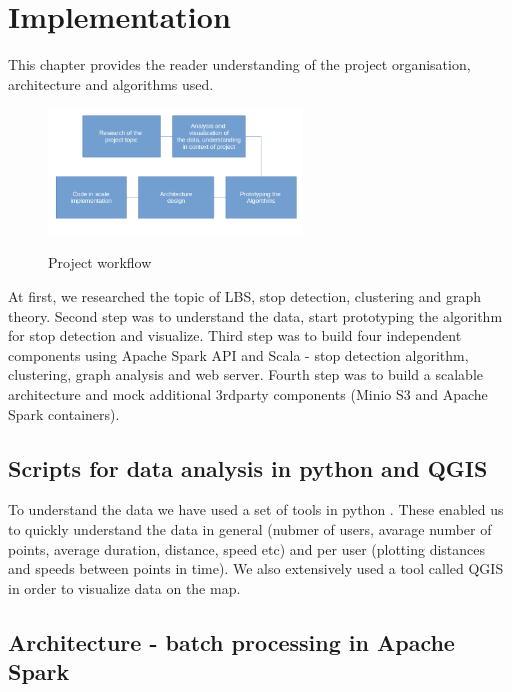 \chapter{Implementation}
\label{cha:implementation}

This chapter provides the reader understanding of the project organisation, architecture and algorithms used.

\begin{figure}[!ht]
	\centering
	\includegraphics[width=0.6\textwidth]{images/workflow.png}\\
	\caption{ Project workflow }
	\label{fig:workflow}
\end{figure}
\FloatBarrier

At first, we researched the topic of LBS, stop detection, clustering and graph theory. Second step was to understand the data, start prototyping the algorithm for stop detection and visualize. Third step was to build four independent components using Apache Spark API and Scala - stop detection algorithm, clustering, graph analysis and web server. Fourth step was to build a scalable architecture and mock additional 3rdparty components (Minio S3 and Apache Spark containers).

\section{Scripts for data analysis in python and QGIS}

To understand the data we have used a set of tools in python \cite{pythonQgis}. These enabled us to quickly understand the data in general (nubmer of users, avarage number of points, average duration, distance, speed etc) and per user (plotting distances and speeds between points in time). We also extensively used a tool called QGIS in order to visualize data on the map. 

\section{Architecture - batch processing in Apache Spark}

